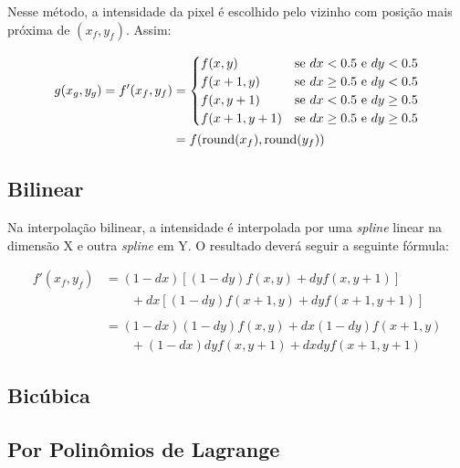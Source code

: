 Nesse método, a intensidade da pixel é escolhido pelo vizinho com posição mais próxima de $(x_f, y_f)$. Assim: %

\begin{align*}
    g(x_g, y_g) = f'(x_f, y_f) &= \begin{cases}
        f(x, y) & \text{se } dx < 0.5 \text{ e } dy < 0.5 \\
        f(x+1, y) & \text{se } dx \geq 0.5 \text{ e } dy < 0.5 \\
        f(x, y+1) & \text{se } dx < 0.5 \text{ e } dy \geq 0.5 \\
        f(x+1, y+1) & \text{se } dx \geq 0.5 \text{ e } dy \geq 0.5 \\
    \end{cases} \\
    &= f(\operatorname{round}(x_f), \operatorname{round}(y_f))
\end{align*}

\subsection{Bilinear} \label{sec:interp:bilinear}

Na interpolação bilinear, a intensidade é interpolada por uma \textit{spline} \autocite{spline} linear na dimensão X e outra \textit{spline} em Y. O resultado deverá seguir a seguinte fórmula:

\begin{align*}
    f'(x_f, y_f) &= (1-dx) \left[(1-dy) f(x,y) + dy f(x,y+1)\right] \\
        &\qquad + dx \left[(1-dy) f(x+1,y) + dy f(x+1,y+1)\right] \\
        \\
        &= (1-dx) (1-dy) f(x,y) + dx (1 - dy) f(x+1,y) \\
        &\qquad + (1-dx) dy f(x,y+1) + dx dy f(x+1,y+1)
\end{align*}

\subsection{Bicúbica} \label{sec:interp:bicubica}

\subsection{Por Polinômios de Lagrange} \label{sec:interp:lagrange}
